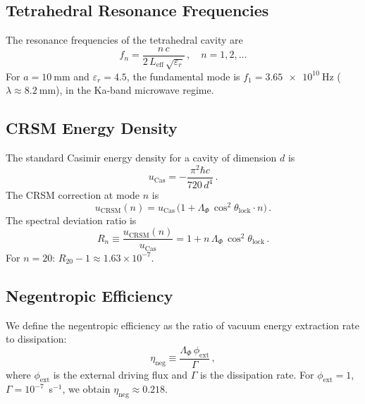 \documentclass[aps,preprint,superscriptaddress,longbibliography]{revtex4-2}
\begin{document}
\subsection{Tetrahedral Resonance Frequencies}

The resonance frequencies of the tetrahedral cavity are
\begin{equation}
f_n = \frac{n\,c}{2\,L_{\mathrm{eff}}\,\sqrt{\varepsilon_r}}\,,
\quad n = 1, 2, \ldots
\label{eq:fn}
\end{equation}
For $a = \SI{10}{\milli\metre}$ and $\varepsilon_r = 4.5$, the
fundamental mode is $f_1 = \SI{3.65e10}{\hertz}$
($\lambda \approx \SI{8.2}{\milli\metre}$), in the Ka-band
microwave regime.

\subsection{CRSM Energy Density}

The standard Casimir energy density for a cavity of dimension
$d$ is
\begin{equation}
u_{\mathrm{Cas}} = -\frac{\pi^2\hbar c}{720\,d^4}\,.
\label{eq:ucas}
\end{equation}
The CRSM correction at mode $n$ is
\begin{equation}
u_{\mathrm{CRSM}}(n) = u_{\mathrm{Cas}}\,
\bigl(1 + \Lambda_\Phi\,\cos^2\theta_{\mathrm{lock}}\cdot n
\bigr)\,.
\label{eq:ucrsm}
\end{equation}
The spectral deviation ratio is
\begin{equation}
R_n \equiv \frac{u_{\mathrm{CRSM}}(n)}{u_{\mathrm{Cas}}}
= 1 + n\,\Lambda_\Phi\,\cos^2\theta_{\mathrm{lock}}\,.
\label{eq:Rn}
\end{equation}
For $n = 20$: $R_{20} - 1 \approx 1.63 \times 10^{-7}$.

\subsection{Negentropic Efficiency}

We define the negentropic efficiency as the ratio of vacuum energy
extraction rate to dissipation:
\begin{equation}
\eta_{\mathrm{neg}} \equiv
\frac{\Lambda_\Phi\,\phi_{\mathrm{ext}}}{\Gamma}\,,
\label{eq:eta}
\end{equation}
where $\phi_{\mathrm{ext}}$ is the external driving flux and
$\Gamma$ is the dissipation rate.  For
$\phi_{\mathrm{ext}} = 1$, $\Gamma = 10^{-7}$~s$^{-1}$, we obtain
$\eta_{\mathrm{neg}} \approx 0.218$.
\end{document}

